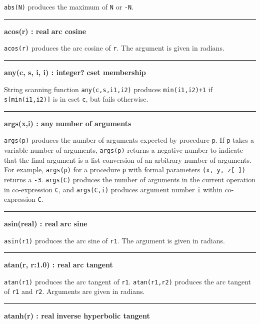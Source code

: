 \noindent
{}\texttt{abs(N)} produces the maximum of
\texttt{N} or \texttt{{}-N}.

\bigskip
\hrule\vspace{0.1cm}
\noindent
{\bf acos(r) : real} \hfill {\bf arc cosine}

\noindent
{}\texttt{acos(r)} produces the arc cosine of
\texttt{r}. The argument is given in radians.

\bigskip
\hrule\vspace{0.1cm}
\noindent
{\bf any(c, s, i, i) : integer? } \hfill {\bf cset membership}

\noindent
{}String scanning function
\texttt{any(c,s,i1,i2)} produces \texttt{min(i1,i2)+1} if \texttt{s[min(i1,i2)]}
is in cset \texttt{c}, but fails otherwise.

\bigskip
\hrule\vspace{0.1cm}
\noindent
{\bf args(x,i) : any } \hfill {\bf number of arguments}

\noindent
{}\texttt{args(p)} produces the number of arguments
expected by procedure \texttt{p}. If \texttt{p} takes a variable number
of arguments, \texttt{args(p)} returns a negative number to indicate
that the final argument is a list conversion of an arbitrary number of
arguments. For example, \texttt{args(p)} for a procedure \texttt{p}
with formal parameters \texttt{(x, y, z[ ])} returns a \texttt{{}-3}.
\texttt{args(C)} produces the number of arguments in the current
operation in co-expression \texttt{C}, and \texttt{args(C,i)} produces
argument number \texttt{i} within co-expression \texttt{C}.

\bigskip
\hrule\vspace{0.1cm}
\noindent
{\bf asin(real) : real } \hfill {\bf arc sine}

\noindent
{}\texttt{asin(r1)} produces the arc sine of \texttt{r1}.
The argument is given in radians.

\bigskip
\hrule\vspace{0.1cm}
\noindent
{\bf atan(r, r:1.0) : real } \hfill {\bf arc tangent}

\noindent
{}\texttt{atan(r1)} produces the arc tangent of
\texttt{r1}. \texttt{atan(r1,r2)} produces the arc tangent of
\texttt{r1} and \texttt{r2}. Arguments are given in radians.

\bigskip
\hrule\vspace{0.1cm}
\noindent
{\bf atanh(r) : real } \hfill {\bf inverse hyperbolic tangent}

